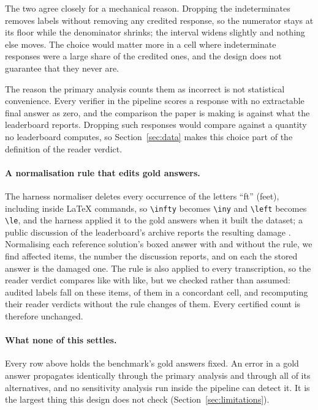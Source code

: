 The two agree closely for a mechanical reason.
Dropping the indeterminates removes labels without removing any credited response, so the
numerator stays at its floor while the denominator shrinks; the interval widens slightly and
nothing else moves. The choice would matter more in a cell where indeterminate responses were
a large share of the credited ones, and the design does not guarantee that they never are.

The reason the primary analysis counts them as incorrect is not statistical convenience. Every
verifier in the pipeline scores a response with no extractable final answer as zero, and the
comparison the paper is making is against what the leaderboard reports. Dropping such
responses would compare against a quantity no leaderboard computes, so Section~\ref{sec:data}
makes this choice part of the definition of the reader verdict.

\paragraph{A normalisation rule that edits gold answers.}
The harness normaliser deletes every occurrence of the letters ``ft'' (feet), including inside
LaTeX commands, so \texttt{\textbackslash infty} becomes \texttt{\textbackslash iny} and
\texttt{\textbackslash left} becomes \texttt{\textbackslash le}, and the harness applied it to the
gold answers when it built the dataset; a public discussion of the leaderboard's archive reports
the resulting damage \citep{oll2026discussion}. Normalising each reference solution's boxed answer
with and without the rule, we find \GoldFtItems{} affected items, the number the discussion
reports, and on each the stored answer is the damaged one. The rule is also applied to every transcription, so the reader verdict
compares like with like, but we checked rather than assumed: \GoldFtLabels{} audited labels fall on
these items, \GoldFtConcordant{} of them in a concordant cell, and recomputing their reader verdicts
without the rule changes \GoldFtChanged{} of them. Every certified count is therefore unchanged.

\paragraph{What none of this settles.}
Every row above holds the benchmark's gold answers fixed. An error in a gold answer propagates
identically through the primary analysis and through all of its alternatives, and no
sensitivity analysis run inside the pipeline can detect it. It is the largest thing this design
does not check (Section~\ref{sec:limitations}).

